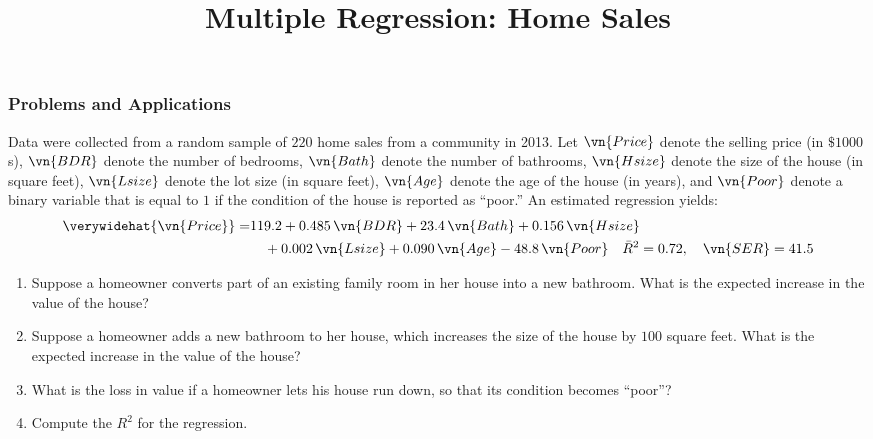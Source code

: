 \title[Multiple Regression]{Multiple Regression: Home Sales}
\date{}







\begin{frame}[shrink=5]
\frametitle{Problems and Applications}
Data were collected from a random sample of $220$ home sales from a community in 2013. Let $\vn{Price}$ denote the selling price (in $\$1000$s), $\vn{BDR}$ denote the number of bedrooms, $\vn{Bath}$ denote the number of bathrooms, $\vn{Hsize}$ denote the size of the house (in square feet), $\vn{Lsize}$ denote the lot size (in square feet), $\vn{Age}$ denote the age of the house (in years), and $\vn{Poor}$ denote a binary variable that is equal to $1$ if the condition of the house is reported as ``poor.'' An estimated regression yields:
\begin{align*}
\verywidehat{\vn{Price}} 
  = & 119.2 + 0.485\,\vn{BDR} + 23.4\,\vn{Bath} + 0.156\,\vn{Hsize} \\
    & \quad + 0.002\,\vn{Lsize} + 0.090\,\vn{Age} - 48.8\,\vn{Poor}
  \quad \bar{R}^2 = 0.72,
  \quad \vn{SER} = 41.5
\end{align*}
\vspace*{-3ex}
\begin{enumerate}
\item Suppose a homeowner converts part of an existing family room in her house into a new bathroom. What is the expected increase in the value of the house?
\item Suppose a homeowner adds a new bathroom to her house, which increases the size of the house by $100$ square feet. What is the expected increase in the value of the house?
\item What is the loss in value if a homeowner lets his house run down, so that its condition becomes ``poor''?
\item Compute the $R^{2}$ for the regression.
\end{enumerate}
\end{frame}


